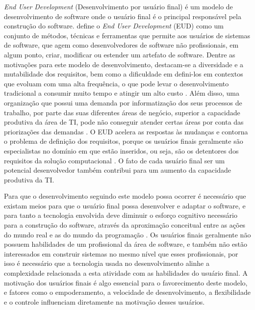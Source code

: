 \textit{End User Development} (Desenvolvimento por usuário final) é um modelo de desenvolvimento de software onde o usuário final é o principal responsável pela construção do software.  define o \textit{End User Development} (EUD) como um conjunto de métodos, técnicas e ferramentas que permite aos usuários de sistemas de software, que agem como desenvolvedores de software não profissionais, em algum ponto, criar, modificar ou estender um artefato de software. Dentre as motivações para este modelo de desenvolvimento, destacam-se a diversidade e a mutabilidade dos requisitos, bem como a dificuldade em defini-los em contextos que evoluam com uma alta frequência, o que pode levar o desenvolvimento tradicional a consumir muito tempo e atingir um alto custo \cite{lieberman2006}. Além disso, uma organização que possui uma demanda por informatização dos seus processos de trabalho, por parte das suas diferentes áreas de negócio, superior a capacidade produtiva da área de TI, pode não conseguir atender certas áreas por conta das priorizações das demandas \cite{artigoTcuGovTI}. O EUD acelera as respostas às mudanças e contorna o problema de definição dos requisitos, porque os usuários finais geralmente são especialistas no domínio em que estão inseridos, ou seja, são os detentores dos requisitos da solução computacional \cite{fischer2004}. O fato de cada usuário final ser um potencial desenvolvedor também contribui para um aumento da capacidade produtiva da TI.

Para que o desenvolvimento seguindo este modelo possa ocorrer é necessário que existam meios para que o usuário final possa desenvolver e adaptar o software, e para tanto a tecnologia envolvida deve diminuir o esforço cognitivo necessário para a construção do software, através da aproximação conceitual entre as ações do mundo real e as do mundo da programação \cite{fischer2004}. Os usuários finais geralmente não possuem habilidades de um profissional da área de software, e também não estão interessados em construir sistemas no mesmo nível que esses profissionais, por isso é necessário que a tecnologia usada no desenvolvimento alinhe a complexidade relacionada a esta atividade com as habilidades do usuário final. A motivação dos usuários finais é algo essencial para o favorecimento deste modelo, e fatores como o empoderamento, a velocidade de desenvolvimento, a flexibilidade e o controle influenciam diretamente na motivação desses usuários.

